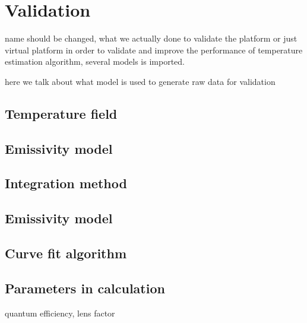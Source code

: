\chapter{Validation}
name should be changed, what we actually done to validate the platform
or just virtual platform
in order to validate and improve the performance of temperature estimation algorithm, several 
models is imported.


here we talk about what model is used to generate raw data for validation
\section{Temperature field}%

%
%
\section{Emissivity model}%


\section{Integration method}

\section{Emissivity model}

\section{Curve fit algorithm}

\section{Parameters in calculation}

quantum efficiency, lens factor